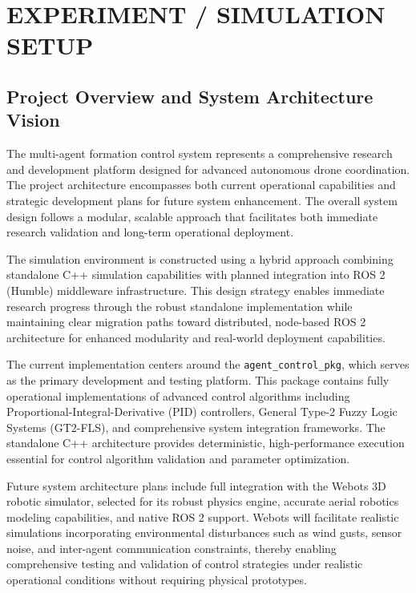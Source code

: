 \section*{EXPERIMENT / SIMULATION SETUP}

\subsection*{Project Overview and System Architecture Vision}

The multi-agent formation control system represents a comprehensive research and development platform designed for advanced autonomous drone coordination. The project architecture encompasses both current operational capabilities and strategic development plans for future system enhancement. The overall system design follows a modular, scalable approach that facilitates both immediate research validation and long-term operational deployment.

The simulation environment is constructed using a hybrid approach combining standalone C++ simulation capabilities with planned integration into ROS 2 (Humble) middleware infrastructure. This design strategy enables immediate research progress through the robust standalone implementation while maintaining clear migration paths toward distributed, node-based ROS 2 architecture for enhanced modularity and real-world deployment capabilities.

The current implementation centers around the \texttt{agent\_control\_pkg}, which serves as the primary development and testing platform. This package contains fully operational implementations of advanced control algorithms including Proportional-Integral-Derivative (PID) controllers, General Type-2 Fuzzy Logic Systems (GT2-FLS), and comprehensive system integration frameworks. The standalone C++ architecture provides deterministic, high-performance execution essential for control algorithm validation and parameter optimization.

Future system architecture plans include full integration with the Webots 3D robotic simulator, selected for its robust physics engine, accurate aerial robotics modeling capabilities, and native ROS 2 support. Webots will facilitate realistic simulations incorporating environmental disturbances such as wind gusts, sensor noise, and inter-agent communication constraints, thereby enabling comprehensive testing and validation of control strategies under realistic operational conditions without requiring physical prototypes.


